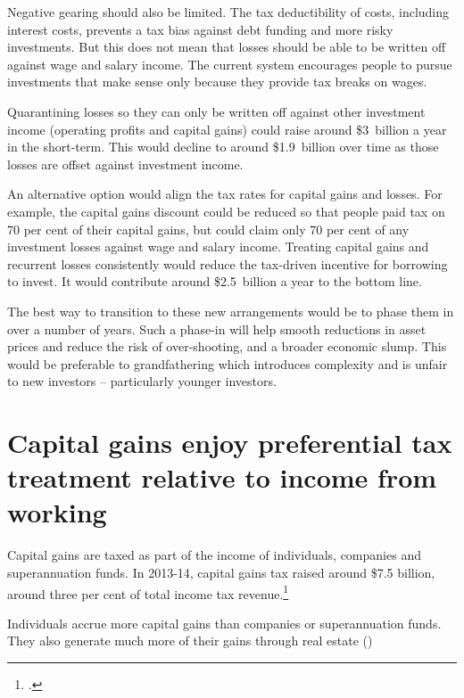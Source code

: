 \documentclass{grattan}\usepackage[]{graphicx}\usepackage[]{color}
\begin{document}
Negative gearing should also be limited. The tax deductibility of costs, including interest costs, prevents a tax bias against debt funding and more risky investments. But this does not mean that losses should be able to be written off against wage and salary income. The current system encourages people to pursue investments that make sense only because they provide tax breaks on wages.

Quarantining losses so they can only be written off against other investment income (operating profits and capital gains) could raise around \$3~billion a year in the short-term. This would decline to around \$1.9~billion over time as those losses are offset against investment income.  

An alternative option would align the tax rates for capital gains and losses.  For example, the capital gains discount could be reduced so that people paid tax on 70 per cent of their capital gains, but could claim only 70 per cent of any investment losses against wage and salary income. Treating capital gains and recurrent losses consistently would reduce the tax-driven incentive for borrowing to invest. It would contribute around \$2.5~billion a year to the bottom line.

The best way to transition to these new arrangements would be to phase them in over a number of years. Such a phase-in will help smooth reductions in asset prices and reduce the risk of over-shooting, and a broader economic slump. This would be preferable to grandfathering which introduces complexity and is unfair to new investors -- particularly younger investors.

\section{Capital gains enjoy preferential tax treatment relative to income from working}
Capital gains are taxed as part of the income of individuals, companies and superannuation funds. In 2013-14, capital gains tax raised around \$7.5 billion, around three per cent of total income tax revenue.\footcite{Treasury2014a} 

Individuals accrue more capital gains than companies or superannuation funds. They also generate much more of their gains through real estate ()
\end{document}
